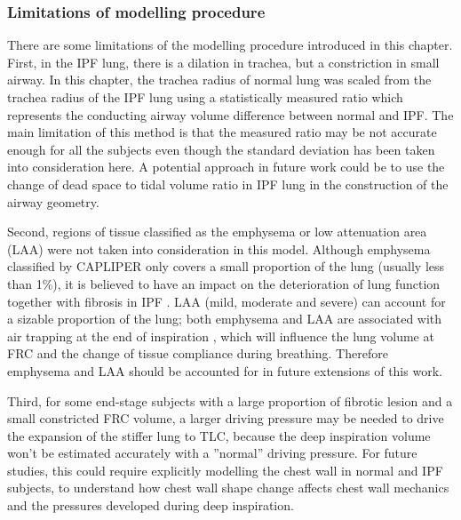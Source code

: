 \subsubsection{Limitations of modelling procedure}
There are some limitations of the modelling procedure introduced in this chapter. First, in the IPF lung, there is a dilation in trachea, but a constriction in small airway. In this chapter, the trachea radius of normal lung was scaled from the trachea radius of the IPF lung using a statistically measured ratio which represents the conducting airway volume difference between normal and IPF. The main limitation of this method is that the measured ratio may be not accurate enough for all the subjects even though the standard deviation has been taken into consideration here. A potential approach in future work could be to use the change of dead space to tidal volume ratio in IPF lung in the construction of the airway geometry. 

Second, regions of tissue classified as the emphysema or low attenuation area (LAA) were not taken into consideration in this model. Although emphysema classified by CAPLIPER only covers a small proportion of the lung (usually less than 1\%), it is believed to have an impact on the deterioration of lung function together with fibrosis in IPF \citep{cottin2005combined, king2011idiopathic, lin2015combined}. LAA (mild, moderate and severe) can account for a sizable proportion of the lung; both emphysema and LAA are associated with air trapping at the end of inspiration \citep{slebos2015air, hoesein2017air}, which will influence the lung volume at FRC and the change of tissue compliance during breathing. Therefore emphysema and LAA should be accounted for in future extensions of this work.

Third, for some end-stage subjects with a large proportion of fibrotic lesion and a small constricted FRC volume, a larger driving pressure may be needed to drive the expansion of the stiffer lung to TLC, because the deep inspiration volume won't be estimated accurately with a ''normal'' driving pressure. For future studies, this could require explicitly modelling the chest wall in normal and IPF subjects, to understand how chest wall shape change affects chest wall mechanics and the pressures developed during deep inspiration.
\newpage

